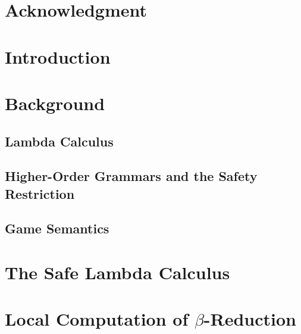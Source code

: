 \begin{romanpages}
\tableofcontents
\listoffigures
\listoftables
\end{romanpages}

\listoftodos
\bigskip

\chapter*{Acknowledgment}
%

\chapter{Introduction}



\chapter{Background}
    \section{Lambda Calculus}
    

    \section{Higher-Order Grammars and the Safety Restriction}
    

    

    \section{Game Semantics}
    

\chapter{The Safe Lambda Calculus}
\label{chap:safelambda}
    
    
    


    
    

    


\chapter{Local Computation of \texorpdfstring{$\beta$}{Beta}-Reduction}
    \label{chap:localbeta}
    

